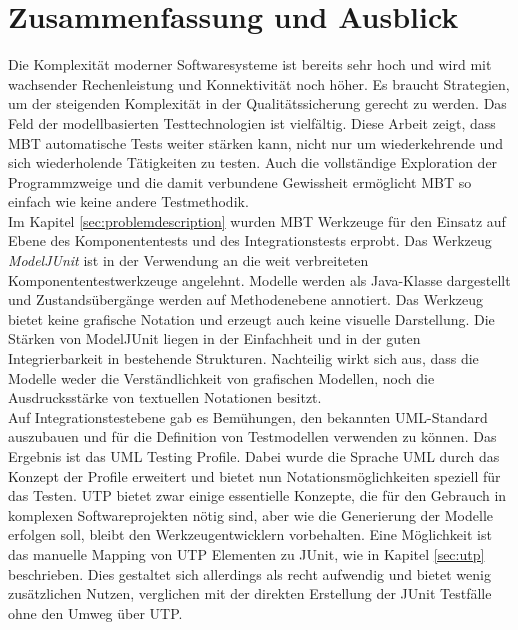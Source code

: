 \section{Zusammenfassung und Ausblick}
\label{sec:conclusion}
Die Komplexität moderner Softwaresysteme ist bereits sehr hoch und wird mit wachsender Rechenleistung und Konnektivität noch höher. Es braucht Strategien, um der steigenden Komplexität in der Qualitätssicherung gerecht zu werden. Das Feld der modellbasierten Testtechnologien ist vielfältig. Diese Arbeit zeigt, dass \Gls{MBT} automatische Tests weiter stärken kann, nicht nur um wiederkehrende und sich wiederholende Tätigkeiten zu testen. Auch die vollständige Exploration der Programmzweige und die damit verbundene Gewissheit ermöglicht \Gls{MBT} so einfach wie keine andere Testmethodik.\\
Im Kapitel \ref{sec:problemdescription}  wurden \Gls{MBT} Werkzeuge für den Einsatz auf Ebene des Komponententests und des Integrationstests erprobt. Das Werkzeug \textit{ModelJUnit} ist in der Verwendung an die weit verbreiteten Komponententestwerkzeuge angelehnt. Modelle werden als Java-Klasse dargestellt und Zustandsübergänge werden auf Methodenebene annotiert. Das Werkzeug bietet keine grafische Notation und erzeugt auch keine visuelle Darstellung. Die Stärken von ModelJUnit liegen in der Einfachheit und in der guten Integrierbarkeit in bestehende Strukturen. Nachteilig wirkt sich aus, dass die Modelle weder die Verständlichkeit von grafischen Modellen, noch die Ausdrucksstärke von textuellen Notationen besitzt.\\
Auf Integrationstestebene gab es Bemühungen, den bekannten UML-Standard auszubauen und für die Definition von Testmodellen verwenden zu können. Das Ergebnis ist das UML Testing Profile. Dabei wurde die Sprache UML durch das Konzept der Profile erweitert und bietet nun Notationsmöglichkeiten speziell für das Testen. \Gls{UTP} bietet zwar einige essentielle Konzepte, die für den Gebrauch in komplexen Softwareprojekten nötig sind, aber wie die Generierung der Modelle erfolgen soll, bleibt den Werkzeugentwicklern vorbehalten. Eine Möglichkeit ist das manuelle Mapping von \Gls{UTP} Elementen zu JUnit, wie in Kapitel \ref{sec:utp} beschrieben. Dies gestaltet sich allerdings als recht aufwendig und bietet wenig zusätzlichen Nutzen, verglichen mit der direkten Erstellung der JUnit Testfälle ohne den Umweg über \Gls{UTP}.\\
